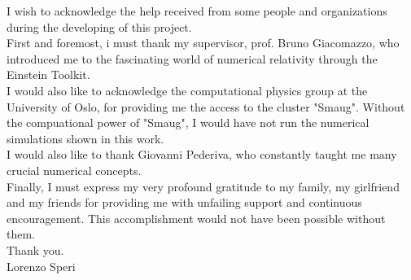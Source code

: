 I wish to acknowledge the help received from some people and organizations during the developing of this project.\\
First and foremost, i must thank my supervisor, prof. Bruno Giacomazzo, who introduced me to the fascinating world of numerical relativity through the Einstein Toolkit. \\
I would also like to acknowledge the computational physics group at the University of Oslo, for providing me the access to the cluster "Smaug". 
Without the compuational power of "Smaug", I would have not run the numerical simulations shown in this work.\\
I would also like to thank Giovanni Pederiva, who constantly taught me many crucial numerical concepts.\\
Finally, I must express my very profound gratitude to my family, my girlfriend and my friends for providing me with unfailing support and continuous encouragement.
This accomplishment would not have been possible without them.\\
Thank you.\\

Lorenzo Speri